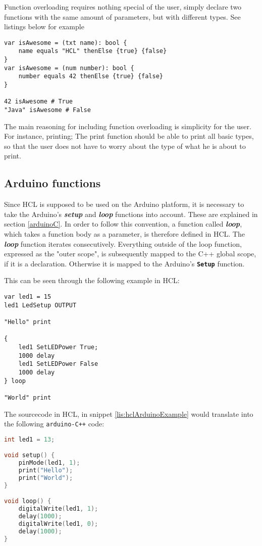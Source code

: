 Function overloading requires nothing special of the user, simply declare two functions with the same amount of parameters, but with different types. 
See listings below for example

\begin{lstlisting}[language=HCL,label=lis:hclTypeDcls,firstnumber=1]
var isAwesome = (txt name): bool {
	name equals "HCL" thenElse {true} {false}
}
var isAwesome = (num number): bool {
	number equals 42 thenElse {true} {false}
}

42 isAwesome # True
"Java" isAwesome # False
\end{lstlisting}

The main reasoning for including function overloading is simplicity for the user.
For instance, printing; 
The print function should be able to print all basic types, so that the user does not have to worry about the type of what he is about to print.

\subsection{Arduino functions}
Since HCL is supposed to be used on the Arduino platform, it is necessary to take the Arduino's \textbf{\textit{setup}} and \textbf{\textit{loop}} functions into account. 
These are explained in section \ref{arduinoC}.
In order to follow this convention, a function called \textbf{\textit{loop}}, which takes a function body as a parameter, is therefore defined in HCL.
The \textbf{\textit{loop}} function iterates consecutively.
Everything outside of the loop function, expressed as the "outer scope", is subsequently mapped to the C++ global scope, if it is a declaration.
Otherwise it is mapped to the Arduino's \textbf{\texttt{Setup}} function.

This can be seen through the following example in HCL:
\begin{lstlisting}[language=HCL,caption={Example of an arduino program in HCL},label={lis:hclArduinoExample},firstnumber=1]
var led1 = 15 
led1 LedSetup OUTPUT 

"Hello" print

{
	led1 SetLEDPower True;
	1000 delay
	led1 SetLEDPower False
	1000 delay
} loop

"World" print 
\end{lstlisting}
The sourcecode in HCL, in snippet \ref{lis:hclArduinoExample} would translate into the following \texttt{arduino-C++} code:
\begin{lstlisting}[language=C,label={lis:cppArduinoExample},firstnumber=1]
int led1 = 13;

void setup() {
	pinMode(led1, 1);
	print("Hello");
	print("World");
}

void loop() {
	digitalWrite(led1, 1);
	delay(1000);
	digitalWrite(led1, 0);
	delay(1000);
} 
\end{lstlisting}

